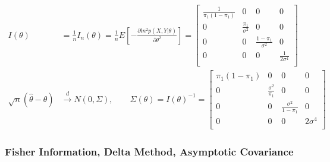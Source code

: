 \documentclass[11pt]{article} %
\begin{document}
	\begin{align*}    
		I(\theta) &=\frac{1}{n} I_n(\theta)= \frac{1}{n} E[- \frac{\partial ln^2 p(X,Y|\theta)}{\partial \theta^2}]
		= \begin{bmatrix}
			\frac{1}{\pi_1(1-\pi_1)} & 0 & 0 & 0\\
			0 & \frac{\pi_1}{\sigma^2} & 0 & 0\\
			0 & 0 & \frac{1-\pi_1}{\sigma^2} & 0\\
			0 & 0 & 0 & \frac{1}{2\sigma^4} \\
		\end{bmatrix}\\
		\sqrt{n} (\hat{\theta} - \theta) & \xrightarrow[]{d} N \left(0, \Sigma \right), \qquad
		\Sigma(\theta) = I(\theta)^{-1} = \begin{bmatrix}
			\pi_1(1-\pi_1) & 0 & 0 & 0\\
			0 & \frac{\sigma^2}{ \pi_1} & 0 & 0\\
			0 & 0 & \frac{\sigma^2}{ 1-\pi_1} & 0\\
			0 & 0 & 0 & 2\sigma^4 \\
		\end{bmatrix}
	\end{align*} 

\subsubsection{Fisher Information, Delta Method, Asymptotic Covariance}
\end{document}
